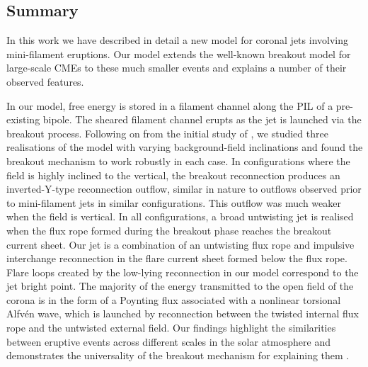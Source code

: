 \documentclass[twocolumn]{aastex6}
\begin{document}





\subsection{Summary}
\label{subsec:summary}

In this work we have described in detail a new model for coronal jets involving mini-filament eruptions. Our model extends the well-known breakout model for large-scale CMEs \citep{Antiochos1998,Antiochos1999} to these much smaller events \citep{Wyper2017} and explains a number of their observed features. 

In our model, free energy is stored in a filament channel along the PIL of a pre-existing bipole. The sheared filament channel erupts as the jet is launched via the breakout process. Following on from the initial study of \citet{Wyper2017},  we studied three realisations of the model with varying background-field inclinations and found the breakout mechanism to work robustly in each case. In configurations where the field is highly inclined to the vertical, the breakout reconnection produces an inverted-Y-type reconnection outflow, similar in nature to outflows observed prior to mini-filament jets in similar configurations. This outflow was much weaker when the field is vertical. In all configurations, a broad untwisting jet is realised when the flux rope formed during the breakout phase reaches the breakout current sheet. Our jet is a combination of an untwisting flux rope and impulsive interchange reconnection in the flare current sheet formed below the flux rope. Flare loops created by the low-lying reconnection in our model correspond to the jet bright point. The majority of the energy transmitted to the open field of the corona is in the form of a Poynting flux associated with a nonlinear torsional Alfv\'{e}n wave, which is launched by reconnection between the twisted internal flux rope and the untwisted external field. Our findings highlight the similarities between eruptive events across different scales in the solar atmosphere and demonstrates the universality of the breakout mechanism for explaining them \citep{Wyper2017}.
\end{document}

